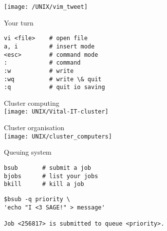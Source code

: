 \documentclass[xcolor=dvipsnames]{beamer}
\begin{document}
\begin{frame}
	\begin{center}
		\texttt{[image: /UNIX/vim\_tweet]}
	\end{center}
\end{frame}

\begin{frame}[fragile]
\begin{center}
	\Huge
	Your turn
\end{center}
\Large
\begin{verbatim}
vi <file>    # open file
a, i         # insert mode
<esc>        # command mode
:            # command
:w           # write
:wq          # write \& quit
:q           # quit io saving
\end{verbatim}
\end{frame}

\begin{frame}
	\begin{center}
		\Huge
		Cluster computing\\
		\vspace{1cm}
		\texttt{[image: UNIX/Vital-IT-cluster]}
	\end{center}
\end{frame}	

\begin{frame}
	\begin{center}
		\Huge
		Cluster organisation\\
		\vspace{1cm}
		\texttt{[image: UNIX/cluster\_computers]}
	\end{center}
\end{frame}

\begin{frame}
	\begin{center}
		\Huge
		Queuing system\\
		\vspace{1cm}

	\end{center}
\end{frame}

\begin{frame}[fragile]
\huge
\begin{verbatim}
bsub       # submit a job
bjobs      # list your jobs
bkill      # kill a job
\end{verbatim}
\end{frame}

\begin{frame}[fragile]
\large
\begin{verbatim}
$bsub -q priority \
'echo "I <3 SAGE!" > message'

Job <256817> is submitted to queue <priority>.
\end{verbatim}
\end{frame}
\end{document}
